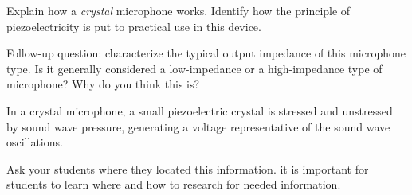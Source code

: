 

Explain how a {\it crystal} microphone works.  Identify how the principle of piezoelectricity is put to practical use in this device.

\vskip 10pt

Follow-up question: characterize the typical output impedance of this microphone type.  Is it generally considered a low-impedance or a high-impedance type of microphone?  Why do you think this is?







In a crystal microphone, a small piezoelectric crystal is stressed and unstressed by sound wave pressure, generating a voltage representative of the sound wave oscillations.







Ask your students where they located this information.  it is important for students to learn where and how to research for needed information.





